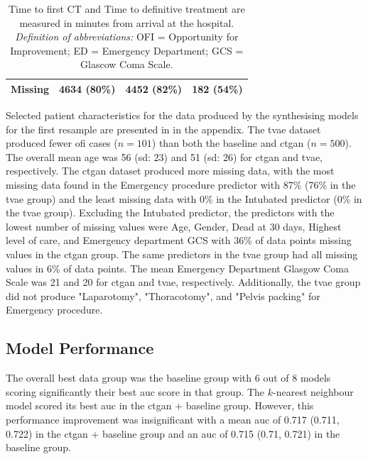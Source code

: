 \documentclass[12pt, a4paper]{article}
\begin{document}
\begin{table}[p]
{\begin{tabular}{lccc}
			\hspace{3mm}Missing                           & 4634 (80\%)       & 4452 (82\%)       & 182 (54\%)       \\
			\bottomrule
		\end{tabular}
	}
	\caption*{\small Time to first CT and Time to definitive treatment are measured in minutes from arrival at the hospital.\\
		\textit{Definition of abbreviations:} OFI = Opportunity for Improvement; ED = Emergency Department; GCS = Glascow Coma Scale.}
\end{table}

Selected patient characteristics for the data produced by the synthesising models for the first resample are presented
in  in the appendix. The \acrshort{tvae} dataset produced fewer \acrshort{ofi}
cases ($n=101$) than both the baseline and \acrshort{ctgan} ($n=500$). The overall mean age was 56 (\acrshort{sd}: 23)
and 51 (\acrshort{sd}: 26) for \acrshort{ctgan} and \acrshort{tvae}, respectively. The \acrshort{ctgan} dataset
produced more missing data, with the most missing data found in the Emergency procedure predictor with 87\% (76\% in
the \acrshort{tvae} group) and the least missing data with 0\% in the Intubated predictor (0\% in the \acrshort{tvae}
group). Excluding the Intubated predictor, the predictors with the lowest number of missing values were Age, Gender,
Dead at 30 days, Highest level of care, and Emergency department GCS with 36\% of data points missing values in the
\acrshort{ctgan} group. The same predictors in the \acrshort{tvae} group had all missing values in 6\% of data points.
The mean Emergency Department Glasgow Coma Scale was 21 and 20 for \acrshort{ctgan} and \acrshort{tvae}, respectively.
Additionally, the \acrshort{tvae} group did not produce "Laparotomy", "Thoracotomy", and "Pelvis packing" for Emergency
procedure.

\subsection{Model Performance}
The overall best data group was the baseline group with 6 out of 8 models scoring significantly their best
\acrshort{auc} score in that group. The $k$-nearest neighbour model scored its best \acrshort{auc} in the
\acrshort{ctgan} + baseline group. However, this performance improvement was insignificant with a mean \acrshort{auc}
of 0.717 (0.711, 0.722) in the \acrshort{ctgan} + baseline group and an \acrshort{auc} of 0.715 (0.71, 0.721) in the
baseline group.
\end{document}
